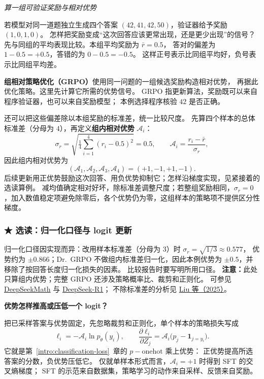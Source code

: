 \begin{example}
\noindent\emph{算一组可验证奖励与相对优势}\par
若模型对同一道题独立生成四个答案 $(42,41,42,50)$，验证器给予奖励 $(1,0,1,0)$。
怎样把奖励变成“这次回答应该更常出现，还是更少出现”的信号？
先与同组的平均表现比较。本组平均奖励为 $\bar r=0.5$，
答对的偏差为 $1-0.5=+0.5$，答错的为 $0-0.5=-0.5$。
这样正号表示比同组平均好，负号表示比同组平均差。

\label{concept:grpo}
\textbf{组相对策略优化（GRPO）}使用同一问题的一组候选奖励构造相对优势，
再据此优化策略。这里先计算它所需的优势信号。
GRPO 指更新算法，奖励既可以来自程序验证器，也可以来自奖励模型；
本例选择程序核验 $42$ 是否正确。

还可以把这些偏差除以本组奖励的标准差，统一比较尺度。
先算四个样本的总体标准差（分母为 $4$），再定义\textbf{组内相对优势} $\mathcal A_i$：
\[
\sigma_r=\sqrt{\tfrac14\sum_{i=1}^4(r_i-0.5)^2}=0.5,
\qquad \mathcal A_i=\frac{r_i-\bar r}{\sigma_r},
\]
因此组内相对优势为
\[
(\mathcal A_1,\mathcal A_2,\mathcal A_3,\mathcal A_4)=\boxed{(+1,-1,+1,-1)}.
\]
后续更新用正优势鼓励这次回答、用负优势抑制它；怎样沿梯度实现，见紧接着的选读算例。
减均值确定相对好坏，除标准差调整尺度；若整组奖励相同，$\sigma_r=0$，加入数值稳定项避免除零后，各个优势仍为零，这组样本的策略项不提供区分性梯度。
\end{example}

\subsubsection*{\texorpdfstring{{\symboliconfont ★}}{★} 选读：归一化口径与 logit 更新}
归一化口径因实现而异：改用样本标准差（分母为 $3$）时 $\sigma_r=\sqrt{1/3}\approx0.577$，
优势约为 $\pm0.866$；Dr.~GRPO 不做组内标准差归一化，因此本例优势为 $\pm0.5$，并移除了按回答长度归一化损失的因素。
比较报告时要写明所用口径。
\textbf{注意：}此处只算组内优势；完整 GRPO 还涉及策略概率比、裁剪和正则化。
可参见 \href{https://arxiv.org/html/2402.03300v3}{DeepSeekMath}
与 \href{https://arxiv.org/abs/2501.12948}{DeepSeek-R1}；
不除标准差的分析见 \href{https://arxiv.org/abs/2503.20783}{Liu 等（2025）}。

\noindent\textbf{优势怎样推高或压低一个 logit？}\par
把已采样答案与优势固定，先忽略裁剪和正则化，单个样本的策略损失写成
\[
\ell_i=-\mathcal A_i\ln p_\theta(y_i),\qquad
\frac{\partial\ell_i}{\partial Z_j}
=\mathcal A_i\bigl(p_j-\mathbf1_{j=y_i}\bigr).
\]
它就是第~\ref*{intro:classification-loss}~章的 $p-\mathrm{onehot}$ 乘上优势：
正优势提高所选答案的分数，负优势压低它。
仅就单样本形式而言，$\mathcal A_i=+1$ 时得到 SFT 的交叉熵梯度；
SFT 的示范来自数据集，策略学习的动作来自采样、反馈来自奖励。

